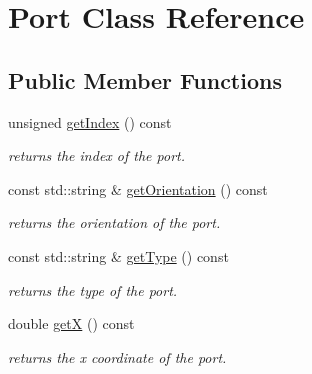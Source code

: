 \hypertarget{class_open_chams_1_1_port}{}\section{Port Class Reference}
\label{class_open_chams_1_1_port}
\subsection*{Public Member Functions}
\begin{DoxyCompactItemize}
\item 
\mbox{\label{class_open_chams_1_1_port_a743f20da85b9a06d9984c0adc337afc1}} 
unsigned \hyperlink{class_open_chams_1_1_port_a743f20da85b9a06d9984c0adc337afc1}{get\+Index} () const
\begin{DoxyCompactList}\small\item\em returns the index of the port. \end{DoxyCompactList}\item 
\mbox{\label{class_open_chams_1_1_port_ace51e4bf9cee0319600c14723efa0dfb}} 
const std\+::string \& \hyperlink{class_open_chams_1_1_port_ace51e4bf9cee0319600c14723efa0dfb}{get\+Orientation} () const
\begin{DoxyCompactList}\small\item\em returns the orientation of the port. \end{DoxyCompactList}\item 
\mbox{\label{class_open_chams_1_1_port_a49fc4eb493558cf55dd00df9ef5f8f08}} 
const std\+::string \& \hyperlink{class_open_chams_1_1_port_a49fc4eb493558cf55dd00df9ef5f8f08}{get\+Type} () const
\begin{DoxyCompactList}\small\item\em returns the type of the port. \end{DoxyCompactList}\item 
\mbox{\label{class_open_chams_1_1_port_a344385751bee0720059403940d57a13e}} 
double \hyperlink{class_open_chams_1_1_port_a344385751bee0720059403940d57a13e}{getX} () const
\begin{DoxyCompactList}\small\item\em returns the x coordinate of the port. \end{DoxyCompactList}\item 

\end{DoxyCompactItemize}
